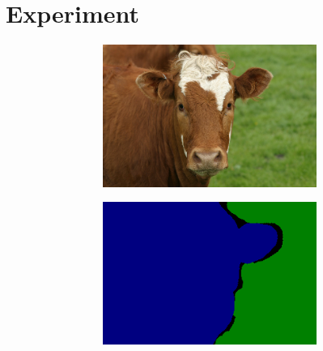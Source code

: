 \documentclass{article} %
\begin{document}
\section{Experiment}
\label{sec:Exp}
\begin{figure}
	\centering
	\begin{subfigure}[c]{\textwidth}
		\centering
		\begin{subfigure}[c]{0.195\textwidth}
			\includegraphics[width = \textwidth]{./img/1_22_s.png}
			\label{fig:1_22_s}
		\end{subfigure}
		\begin{subfigure}[c]{0.195\textwidth}
			\includegraphics[width = \textwidth]{./img/1_22_s_GT.png}
			\label{fig:1_22_s_lab}
		\end{subfigure}
		\begin{subfigure}[c]{0.195\textwidth}

\end{subfigure}
\end{subfigure}
\end{figure}
\end{document}
